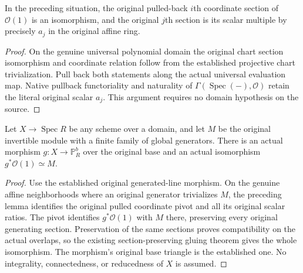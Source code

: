 \begin{lemma}
\label{lem:kn-arithmetic-original-line-tuple}
\leanok
{}
In the preceding situation, the original pulled-back $i$th coordinate
section of $\mathcal O(1)$ is an isomorphism, and the original $j$th section
is its scalar multiple by precisely $a_j$ in the original affine ring.
\end{lemma}
\begin{proof}
On the genuine universal polynomial domain the original chart section
isomorphism and coordinate relation follow from the established projective
chart trivialization.  Pull back both statements along the actual universal
evaluation map.  Native pullback functoriality and naturality of
$\Gamma(\operatorname{Spec}(-),\mathcal O)$ retain the literal original
scalar $a_j$.  This argument requires no domain hypothesis on the source.
\end{proof}

\begin{theorem}
\label{thm:kn-arithmetic-original-line-generated}
\leanok
{}
Let $X\to\operatorname{Spec}R$ be any scheme over a domain, and let $M$
be the original invertible module with a finite family of global generators.
There is an actual morphism $g:X\to\mathbb P^b_R$ over the original base
and an actual isomorphism $g^*\mathcal O(1)\simeq M$.
\end{theorem}
\begin{proof}
Use the established original generated-line morphism.  On the genuine
affine neighborhoods where an original generator trivializes $M$, the
preceding lemma identifies the original pulled coordinate pivot and all
its original scalar ratios.  The pivot identifies $g^*\mathcal O(1)$ with
$M$ there, preserving every original generating section.  Preservation of
the same sections proves compatibility on the actual overlaps, so the
existing section-preserving gluing theorem gives the whole isomorphism.
The morphism's original base triangle is the established one.  No
integrality, connectedness, or reducedness of $X$ is assumed.
\end{proof}

